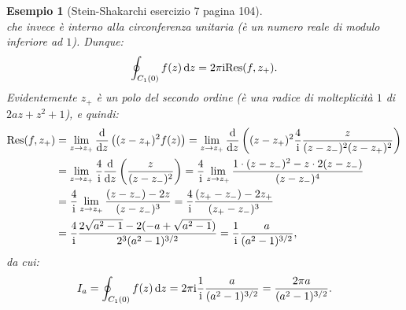\documentclass[11pt]{book}
\theoremstyle{Definizione}
\theoremstyle{TeoremaProposizioneLemmaCorollarioCongettura}
\theoremstyle{OsservazioneNotaEsempio}
\newtheorem{myes}{Esempio}[section]
\renewcommand{\i}{\textup{i}}
\renewcommand{\d}{\mathrm{d}}
\newcommand{\dz}{\,\d z}
\newcommand{\Res}{\textup{Res}}
\begin{document}
\begin{myes}[Stein-Shakarchi esercizio 7 pagina 104]
$$$$
che invece è interno alla circonferenza unitaria (è un numero reale di modulo inferiore ad $1$). Dunque:
$$
\oint_{C_1(0)} f(z) \dz = 2\pi\i \Res(f,z_+).
$$
Evidentemente $z_+$ è un polo del secondo ordine (è una radice di molteplicità $1$ di $2az+z^2+1$), e quindi:
\begin{align*}
\Res(f,z_+) &= \lim_{z \to z_+} \frac{\d }{\d z}\left((z-z_+)^2 f(z)\right) = \lim_{z \to z_+} \frac{\d}{\d z}\left((z-z_+)^2\frac{4}{\i}\frac{z}{(z-z_-)^2(z-z_+)^2}\right) \\
&= \lim_{z \to z_+} \frac{4}{\i}\frac{\d}{\d z} \left(\frac{z}{(z-z_-)^2}\right)  = \frac{4}{\i}\lim_{z \to z_+} \frac{1\cdot (z-z_-)^2-z\cdot 2(z-z_-)}{(z-z_-)^4}\\
&= \frac{4}{\i} \lim_{z \to z_+} \frac{(z-z_-)-2z}{(z-z_-)^3} = \frac{4}{\i}\frac{(z_+-z_-)-2z_+}{(z_+-z_-)^3} \\
&= \frac{4}{\i} \frac{2\sqrt{a^2-1}-2(-a+\sqrt{a^2-1})}{2^3(a^2-1)^{3/2}} = \frac{1}{\i}\frac{a}{(a^2-1)^{3/2}},
\end{align*}
da cui:
$$
I_a = \oint_{C_1(0)} f(z)\dz = 2\pi \i \frac{1}{\i}\frac{a}{(a^2-1)^{3/2}} = \frac{2\pi a}{(a^2-1)^{3/2}}.
$$
\end{myes}
\end{document}
